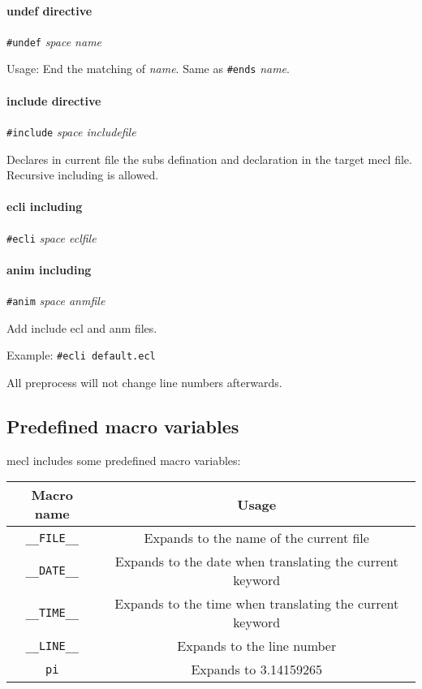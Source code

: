 \documentclass{article}
\begin{document}
\paragraph{undef directive} \verb|#undef| \textit{space name}

Usage: End the matching of \textit{name}. Same as \verb|#ends| \textit{name}.

\paragraph{include directive} \verb|#include| \textit{space includefile}

Declares in current file the subs defination and declaration in the target mecl file. Recursive including is allowed.

\paragraph{ecli including} \verb|#ecli| \textit{space eclfile}
\paragraph{anim including} \verb|#anim| \textit{space anmfile}

Add include ecl and anm files.

Example: \verb|#ecli default.ecl|

All preprocess will not change line numbers afterwards.

\subsection{Predefined macro variables}

mecl includes some predefined macro variables:

\begin{table}[H]
	\centering
	\begin{tabular}{c|c}
		\hline
		Macro name & Usage \\\hline
		\verb|__FILE__| & Expands to the name of the current file \\\hline
		\verb|__DATE__| & Expands to the date when translating the current keyword \\\hline
		\verb|__TIME__| & Expands to the time when translating the current keyword \\\hline
		\verb|__LINE__| & Expands to the line number \\\hline
		\verb|pi| & Expands to 3.14159265 \\\hline
	\end{tabular}
\end{table}
\end{document}
